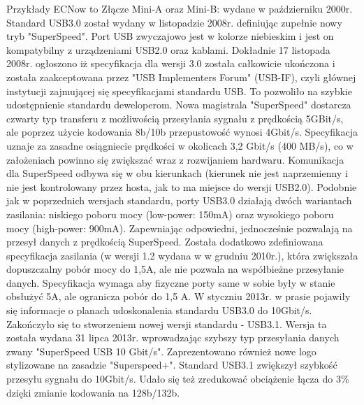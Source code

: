 \documentclass{BscUS}
\begin{document}
\newline
Przykłady ECNow to
Złącze Mini-A oraz Mini-B: wydane w październiku 2000r.\cite{USB20Doc}
\newline
\indent Standard USB3.0 został wydany w listopadzie 2008r. definiując zupełnie nowy tryb "SuperSpeed". Port USB zwyczajowo jest w kolorze niebieskim i jest on kompatybilny z urządzeniami USB2.0 oraz kablami.
Dokładnie 17 listopada 2008r. ogłoszono iż specyfikacja dla wersji 3.0 została całkowicie ukończona i została zaakceptowana przez "USB Implementers Forum" (USB-IF), czyli głównej instytucji zajmującej się specyfikacjami standardu USB. To pozwoliło na szybkie udostępnienie standardu deweloperom.
Nowa magistrala "SuperSpeed" dostarcza czwarty typ transferu z możliwością przesyłania sygnału z prędkością 5GBit/s, ale poprzez użycie kodowania 8b/10b przepustowość wynosi 4Gbit/s. Specyfikacja uznaje za zasadne osiągniecie prędkości w okolicach 3,2 Gbit/s (400 MB/s), co w założeniach powinno się zwiększać wraz z rozwijaniem hardwaru. Komunikacja dla SuperSpeed odbywa się w obu kierunkach (kierunek nie jest naprzemienny i nie jest kontrolowany przez hosta, jak to ma miejsce do wersji USB2.0).
Podobnie jak w poprzednich wersjach standardu, porty USB3.0 działają dwóch wariantach zasilania: niskiego poboru mocy (low-power: 150mA) oraz wysokiego poboru mocy (high-power: 900mA). Zapewniając odpowiedni, jednocześnie pozwalają na przesył danych z prędkością SuperSpeed.
Została dodatkowo zdefiniowana specyfikacja zasilania (w wersji 1.2 wydana w w grudniu 2010r.), która zwiększała dopuszczalny pobór mocy do 1,5A, ale nie pozwala na współbieżne przesyłanie danych. Specyfikacja wymaga aby fizyczne porty same w sobie były w stanie obsłużyć 5A, ale ogranicza pobór do 1,5 A.
\cite{USB30Doc}
\newline
\indent W styczniu 2013r. w prasie pojawiły się informacje o planach udoskonalenia standardu USB3.0 do 10Gbit/s. Zakończyło się to stworzeniem nowej wersji standardu - USB3.1. Wersja ta została wydana 31 lipca 2013r. wprowadzając szybszy typ przesyłania danych zwany "SuperSpeed USB 10 Gbit/s". Zaprezentowano również nowe logo stylizowane na zasadzie "Superspeed+". Standard USB3.1 zwiększył szybkość przesyłu sygnału do 10Gbit/s. Udało się też zredukować obciążenie łącza do 3\% dzięki zmianie kodowania na 128b/132b.
\end{document}

